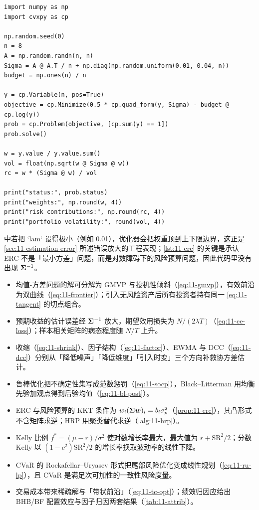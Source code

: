 \begin{lstlisting}[style=pythonstyle,
                   caption={用凸对数障碍形式求解等风险贡献（ERC）组合},
                   label={lst:11-erc}]
import numpy as np
import cvxpy as cp

np.random.seed(0)
n = 8
A = np.random.randn(n, n)
Sigma = A @ A.T / n + np.diag(np.random.uniform(0.01, 0.04, n))
budget = np.ones(n) / n

y = cp.Variable(n, pos=True)
objective = cp.Minimize(0.5 * cp.quad_form(y, Sigma) - budget @ cp.log(y))
prob = cp.Problem(objective, [cp.sum(y) == 1])
prob.solve()

w = y.value / y.value.sum()
vol = float(np.sqrt(w @ Sigma @ w))
rc = w * (Sigma @ w) / vol

print("status:", prob.status)
print("weights:", np.round(w, 4))
print("risk contributions:", np.round(rc, 4))
print("portfolio volatility:", round(vol, 4))
\end{lstlisting}

 中若把 `lam` 设得极小（例如 0.01），优化器会把权重顶到上下限边界，这正是 \cref{sec:11-estimation-error} 所述错误放大的工程表现；\cref{lst:11-erc} 的关键是承认 ERC 不是「最小方差」问题，而是对数障碍下的风险预算问题，因此代码里没有出现 $\bm{\Sigma}^{-1}$。

\begin{summarybox}
\begin{itemize}[leftmargin=1.4em, itemsep=2pt]
  \item 均值-方差问题的解可分解为 GMVP 与投机性倾斜（\cref{eq:11-gmvp}），有效前沿为双曲线（\cref{eq:11-frontier}）；引入无风险资产后所有投资者持有同一 \cref{eq:11-tangent} 的切点组合。
  \item 预期收益的估计误差经 $\bm{\Sigma}^{-1}$ 放大，期望效用损失为 $N/(2\lambda T)$（\cref{eq:11-ce-loss}）；样本相关矩阵的病态程度随 $N/T$ 上升。
  \item 收缩（\cref{eq:11-shrink}）、因子结构（\cref{eq:11-factor}）、EWMA 与 DCC（\cref{eq:11-dcc}）分别从「降低噪声」「降低维度」「引入时变」三个方向补救协方差估计。
  \item 鲁棒优化把不确定性集写成范数惩罚（\cref{eq:11-socp}），Black--Litterman 用均衡先验加观点得到后验均值（\cref{eq:11-bl-post}）。
  \item ERC 与风险预算的 KKT 条件为 $w_i(\bm{\Sigma}\bm{w})_i = b_i\sigma_p^{2}$（\cref{prop:11-erc}），其凸形式不含矩阵求逆；HRP 用聚类替代求逆（\cref{alg:11-hrp}）。
  \item Kelly 比例 $f^{*} = (\mu-r)/\sigma^{2}$ 使对数增长率最大，最大值为 $r + \text{SR}^{2}/2$；分数 Kelly 以 $(1-c^{2})\text{SR}^{2}/2$ 的增长率换取波动率的线性下降。
  \item CVaR 的 Rockafellar--Uryasev 形式把尾部风险优化变成线性规划（\cref{eq:11-ru-lp}），且 CVaR 是满足次可加性的一致性风险度量。
  \item 交易成本带来稀疏解与「带状前沿」（\cref{eq:11-tc-opt}）；绩效归因应给出 BHB/BF 配置效应与因子归因两套结果（\cref{tab:11-attrib}）。
\end{itemize}
\end{summarybox}

